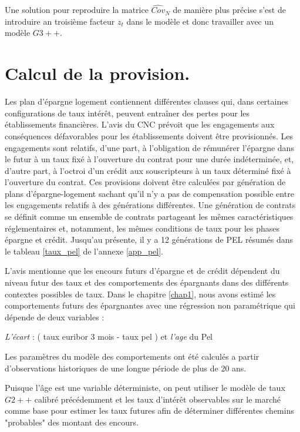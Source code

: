 \documentclass[12pt, a4paper]{book}
\begin{document}
Une solution pour reproduire la matrice $\widehat{Cov}_N$ de manière plus précise s'est de introduire an troisième facteur $z_t$ dans le modèle et donc travailler avec un modèle $G3++.$

\section{Calcul de la provision.}

Les plan d'épargne logement contiennent différentes clauses qui, dans certaines configurations de taux intérêt, peuvent entraîner des pertes pour les établissements financières. L'avis du CNC \cite{CNC1} prévoit que les engagements aux conséquences défavorables pour les établissements doivent être provisionnés. Les engagements sont relatifs, d'une part, à l'obligation de rémunérer l'épargne dans le futur à un taux fixé à l'ouverture du contrat pour une durée indéterminée, et, d'autre part, à l'octroi d'un crédit aux souscripteurs à un taux déterminé fixé à l'ouverture du contrat.
Ces provisions doivent être calculées par génération de plans d'épargne-logement sachant qu'il n'y a pas de compensation possible entre les engagements relatifs à des générations différentes. Une génération de contrats se définit comme un ensemble de contrats partageant les mêmes caractéristiques réglementaires et, notamment, les mêmes conditions de taux pour les phases épargne et crédit. Jusqu'au présente, il y a 12 générations de PEL résumés dans le tableau \ref{taux_pel} de l'annexe \ref{app_pel}.

L'avis \cite{CNC1} mentionne que les encours futurs d'épargne et de crédit dépendent du niveau futur des
taux et des comportements des épargnants dans des différents contextes possibles de taux. Dans le chapitre \ref{chap1}, nous avons  estimé les comportements futurs des épargnantes avec une régression non paramétrique qui dépende de deux variables : 
\begin{center}
{\it L'écart} : ( taux euribor 3 mois - taux pel ) et {\it l'age} du Pel
\end{center}
Les paramètres du modèle des comportements ont été calculés a partir d'observations historiques de une longue période de plus de 20 ans. 

Puisque l'âge est une variable déterministe, on peut utiliser le modèle de taux $G2++$ calibré précédemment et les taux d'intérêt observables sur le marché comme base pour estimer les taux futures afin de déterminer différentes chemins "probables"  des montant des encours. 
\end{document}
